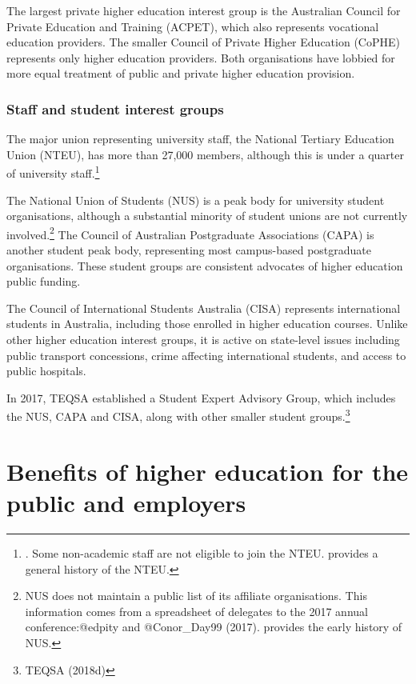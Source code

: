 \documentclass{grattan}
\begin{document}
The largest private higher education interest group is the Australian Council for Private Education and Training (ACPET), which also represents vocational education providers. The smaller Council of Private Higher Education (CoPHE) represents only higher education providers. Both organisations have lobbied for more equal treatment of public and private higher education provision.

%
\subsection{Staff and student interest groups}\label{subsec:staff-and-student-interest-groups}

The major union representing university staff, the National Tertiary Education Union (NTEU), has more than 27,000 members, although this is under a quarter of university staff.\footnote{\textcite[][25]{NTEU2017nteuannualreport}. Some non-academic staff are not eligible to join the NTEU. \textcite[][]{OBrien2015nationaltertiarye} provides a general history of the NTEU.}

The National Union of Students (NUS) is a peak body for university student organisations, although a substantial minority of student unions are not currently involved.\footnote{NUS does not maintain a public list of its affiliate organisations. This information comes from a spreadsheet of delegates to the 2017 annual conference:@edpity and @Conor\_Day99 (2017). \textcite[][]{Hastings2003itcanthappenher} provides the early history of NUS.} The Council of Australian Postgraduate Associations (CAPA) is another student peak body, representing most campus-based postgraduate organisations. These student groups are consistent advocates of higher education public funding.

The Council of International Students Australia (CISA) represents international students in Australia, including those enrolled in higher education courses. Unlike other higher education interest groups, it is active on state-level issues including public transport concessions, crime affecting international students, and access to public hospitals.

In 2017, TEQSA established a Student Expert Advisory Group, which includes the NUS, CAPA and CISA, along with other smaller student groups.\footnote{TEQSA (2018d)}

%
\chapter{Benefits of higher education for the public and employers}\label{chap:benefits-of-higher-education-for-the-public-and-employers}
\end{document}
